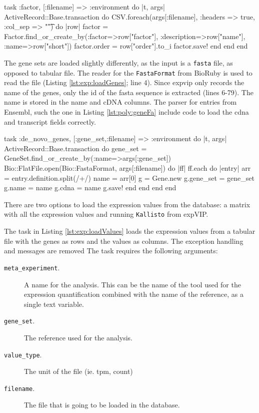 \begin{code}[label=lst:exp:loadFactor, language=ruby, caption={[Load factors]Task that loads factors}]
task :factor, [:filename] => :environment do |t, args|
  ActiveRecord::Base.transaction do 
    CSV.foreach(args[:filename], :headers => true, :col_sep => "\t") do |row|
      factor = Factor.find_or_create_by(:factor=>row["factor"],  :description=>row["name"],  :name=>row["short"])
      factor.order = row["order"].to_i
      factor.save!
    end
  end
end
\end{code}

The gene sets are loaded slightly differently, as the input is a \verb|fasta| file, as opposed to tabular file. 
The reader for the \verb|FastaFormat| from BioRuby \citep{Goto2010} is used to read the file (Listing \ref{lst:exp:loadGenes}; line 4). 
Since \gls{expvip} only records the name of the genes, only the id of the fasta sequence is extracted (lines 6-79). 
The name is stored in the name and cDNA columns. 
The parser for entries from Ensembl, such the one in Listing \ref{lst:poly:geneFa} include code to load the \acrshort{cdna} and transcript fields correctly. 

\begin{code}[language=ruby, caption={[Load genes from Fasta]Task that load genes from a fasta file}, label=lst:exp:loadGenes]
task :de_novo_genes, [:gene_set,:filename] => :environment do |t, args|
  ActiveRecord::Base.transaction do
    gene_set = GeneSet.find_or_create_by(:name=>args[:gene_set])
    Bio::FlatFile.open(Bio::FastaFormat, args[:filename]) do |ff|
      ff.each do |entry| 
        arr = entry.definition.split(/\s+/)
        name = arr[0]
        g = Gene.new 
        g.gene_set = gene_set
        g.name = name
        g.cdna = name
        g.save!
      end
    end
  end
end
\end{code}

There are two options to load the expression values from the database: a matrix with all the expression values and running \verb|Kallisto| from expVIP. 

The task in Listing \ref{lst:exp:loadValues} loads the expression values from a tabular file with the genes as rows and the values as columns. 
The exception handling and messages are removed 
The task requires the following arguments:

\begin{description}
\item[\texttt{meta\_experiment}.] A name for the analysis. This can be the name of the tool used for the expression quantification combined with the name of the reference, as a single text variable. 
\item[\texttt{gene\_set}.] The reference used for the analysis. 
\item[\texttt{value\_type}.] The unit of the file (ie.  \acrshort{tpm}, count)
\item[\texttt{filename}.] The file that is going to be loaded in the database. 
\end{description}

